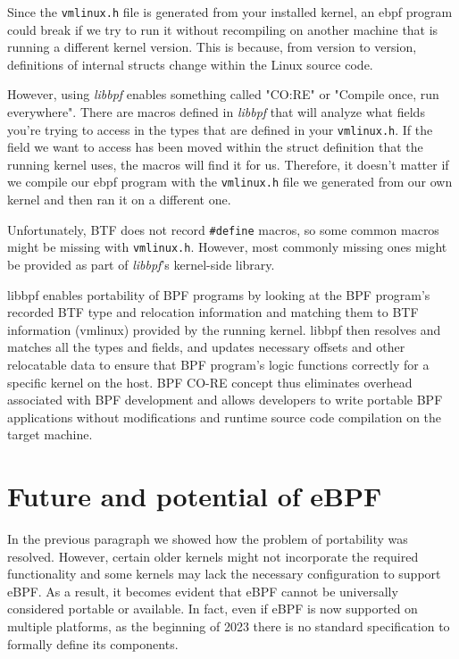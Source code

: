 Since the \verb|vmlinux.h| file is generated from your installed kernel, an ebpf program could break if we try to run it without recompiling on another machine that is running a different kernel version. 
This is because, from version to version, definitions of internal structs change within the Linux source code.

However, using \textit{libbpf} enables something called "CO:RE" or "Compile once, run everywhere". 
There are macros defined in \textit{libbpf} that will analyze what fields you're trying to access in the types that are defined in your \verb|vmlinux.h|. 
If the field we want to access has been moved within the struct definition that the running kernel uses, the macros will find it for us. 
Therefore, it doesn't matter if we compile our ebpf program with the \verb|vmlinux.h| file we generated from our own kernel and then ran it on a different one.

Unfortunately, BTF does not record \verb|#define| macros, so some common macros might be missing with \verb|vmlinux.h|. 
However, most commonly missing ones might be provided as part of \textit{libbpf}’s kernel-side library.


libbpf enables portability of BPF programs by looking at the BPF program’s recorded BTF type and relocation information and matching them to BTF information (vmlinux) provided by the running kernel. libbpf then resolves and matches all the types and fields, and updates necessary offsets and other relocatable data to ensure that BPF program’s logic functions correctly for a specific kernel on the host. BPF CO-RE concept thus eliminates overhead associated with BPF development and allows developers to write portable BPF applications without modifications and runtime source code compilation on the target machine.


\section{Future and potential of eBPF}

In the previous paragraph we showed how the problem of portability was resolved.
However, certain older kernels might not incorporate the required functionality and some kernels may lack the necessary configuration to support eBPF. 
As a result, it becomes evident that eBPF cannot be universally considered portable or available.
In fact, even if eBPF is now supported on multiple platforms, as the beginning of 2023 there is no standard specification to formally define its components. 

